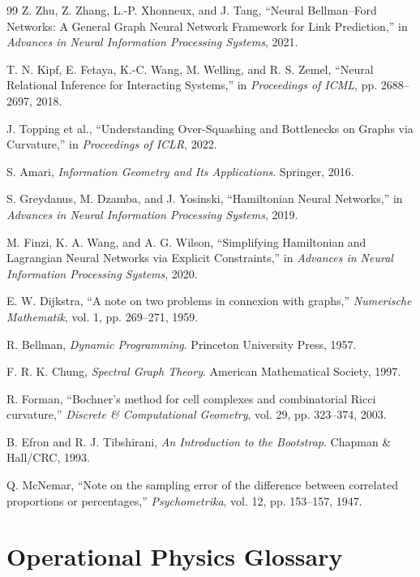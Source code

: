 \documentclass[11pt]{article}
\begin{document}
\begin{thebibliography}{99}
Z. Zhu, Z. Zhang, L.-P. Xhonneux, and J. Tang, ``Neural Bellman--Ford Networks:
A General Graph Neural Network Framework for Link Prediction,'' in
\emph{Advances in Neural Information Processing Systems}, 2021.

T. N. Kipf, E. Fetaya, K.-C. Wang, M. Welling, and R. S. Zemel, ``Neural
Relational Inference for Interacting Systems,'' in \emph{Proceedings of ICML},
pp. 2688--2697, 2018.

J. Topping et al., ``Understanding Over-Squashing and Bottlenecks on Graphs via
Curvature,'' in \emph{Proceedings of ICLR}, 2022.

S. Amari, \emph{Information Geometry and Its Applications}. Springer, 2016.

S. Greydanus, M. Dzamba, and J. Yosinski, ``Hamiltonian Neural Networks,'' in
\emph{Advances in Neural Information Processing Systems}, 2019.

M. Finzi, K. A. Wang, and A. G. Wilson, ``Simplifying Hamiltonian and
Lagrangian Neural Networks via Explicit Constraints,'' in \emph{Advances in
Neural Information Processing Systems}, 2020.

E. W. Dijkstra, ``A note on two problems in connexion with graphs,''
\emph{Numerische Mathematik}, vol. 1, pp. 269--271, 1959.

R. Bellman, \emph{Dynamic Programming}. Princeton University Press, 1957.

F. R. K. Chung, \emph{Spectral Graph Theory}. American Mathematical Society,
1997.

R. Forman, ``Bochner's method for cell complexes and combinatorial Ricci
curvature,'' \emph{Discrete \& Computational Geometry}, vol. 29,
pp. 323--374, 2003.

B. Efron and R. J. Tibshirani, \emph{An Introduction to the Bootstrap}.
Chapman \& Hall/CRC, 1993.

Q. McNemar, ``Note on the sampling error of the difference between correlated
proportions or percentages,'' \emph{Psychometrika}, vol. 12, pp. 153--157,
1947.

\end{thebibliography}

\appendix
\section{Operational Physics Glossary}
\end{document}
